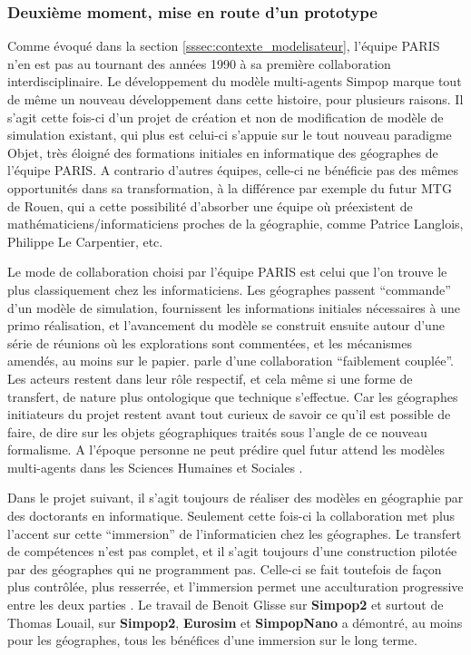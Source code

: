 \subsubsection{Deuxième moment, mise en route d'un prototype}
\label{sssec:deuxieme_moment}

Comme évoqué dans la section \ref{sssec:contexte_modelisateur}, l'équipe PARIS n'en est pas au tournant des années 1990 à sa première collaboration interdisciplinaire. Le développement du modèle multi-agents Simpop \autocites{GuerinPace1993, Bura1995} marque tout de même un nouveau développement dans cette histoire, pour plusieurs raisons. Il s'agit cette fois-ci d'un projet de création et non de modification de modèle de simulation existant, qui plus est celui-ci s'appuie sur le tout nouveau paradigme Objet, très éloigné des formations initiales en informatique des géographes de l'équipe PARIS. A contrario d'autres équipes, celle-ci ne bénéficie pas des mêmes opportunités dans sa transformation, à la différence par exemple du futur MTG de Rouen, qui a cette possibilité d'absorber  une équipe où préexistent de mathématiciens/informaticiens proches de la géographie, comme Patrice Langlois, Philippe Le Carpentier, etc.

Le mode de collaboration choisi par l'équipe PARIS est celui que l'on trouve le plus classiquement chez les informaticiens. Les géographes passent \enquote{commande} d'un modèle de simulation, fournissent les informations initiales nécessaires à une primo réalisation, et l'avancement du modèle se construit ensuite autour d'une série de réunions où les explorations sont commentées, et les mécanismes amendés, au moins sur le papier. \textcite[10]{Louail2010} parle d'une collaboration \enquote{faiblement couplée}. Les acteurs restent dans leur rôle respectif, et cela même si une forme de transfert, de nature plus ontologique que technique  s'effectue. Car les géographes initiateurs du projet restent avant tout curieux de savoir ce qu'il est possible de faire, de dire sur les objets géographiques traités sous l'angle de ce nouveau formalisme. A l'époque personne ne peut prédire quel futur attend les modèles multi-agents dans les Sciences Humaines et Sociales .

Dans le projet suivant, il s'agit toujours de réaliser des modèles en géographie par des doctorants en informatique. Seulement cette fois-ci la collaboration met plus l'accent sur cette \enquote{immersion} de l'informaticien chez les géographes. Le transfert de compétences n'est pas complet, et il s'agit toujours d'une construction pilotée par des géographes qui ne programment pas. Celle-ci se fait toutefois de façon plus contrôlée, plus resserrée, et l'immersion permet une acculturation progressive entre les deux parties \autocite[11]{Louail2010}. Le travail de Benoit Glisse sur \textbf{Simpop2} et surtout de Thomas Louail, sur \textbf{Simpop2}, \textbf{Eurosim} et \textbf{SimpopNano} a démontré, au moins pour les géographes, tous les bénéfices d'une immersion sur le long terme.

